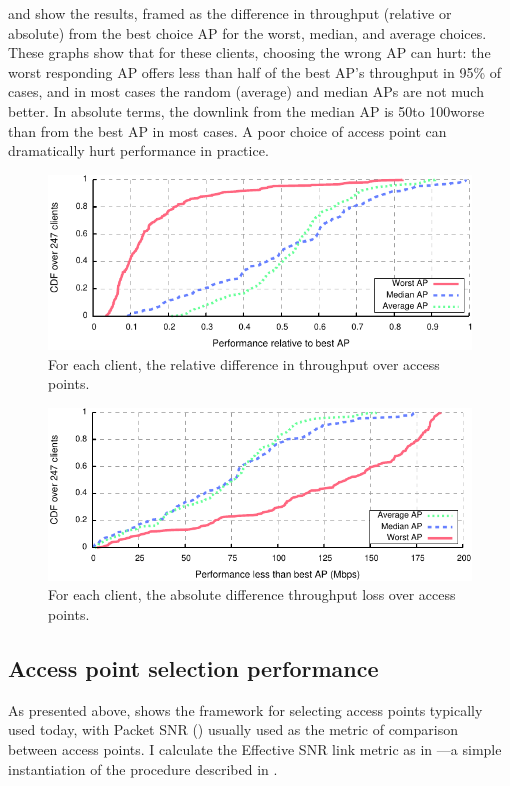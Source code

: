  and  show the results, framed as the difference in throughput (relative or absolute) from the best choice AP for the worst, median, and average choices. These graphs show that for these clients, choosing the wrong AP can hurt: the worst responding AP offers less than half of the best AP's throughput in 95\% of cases, and in most cases the random (average) and median APs are not much better. In absolute terms, the downlink from the median AP is 50\Mbps to 100\Mbps worse than from the best AP in most cases. A poor choice of access point can dramatically hurt performance in practice.

\begin{figure}[t]
	\centering
	\includegraphics[width=\textwidth]{figures/applications/ap_sel_rel_diff.pdf}
	\caption{\label{fig:ap_sel_rel_diff}For each client, the relative difference in throughput over access points.}
\end{figure}

\begin{figure}[t]
	\centering
	\includegraphics[width=\textwidth]{figures/applications/ap_sel_tpt_diff.pdf}
	\caption{\label{fig:ap_sel_tpt_diff}For each client, the absolute difference throughput loss over access points.}
\end{figure}

\subsection{Access point selection performance}
As presented above,  shows the framework for selecting access points typically used today, with Packet SNR () usually used as the metric of comparison between access points. I calculate the Effective SNR link metric as in ---a simple instantiation of the procedure described in . 

